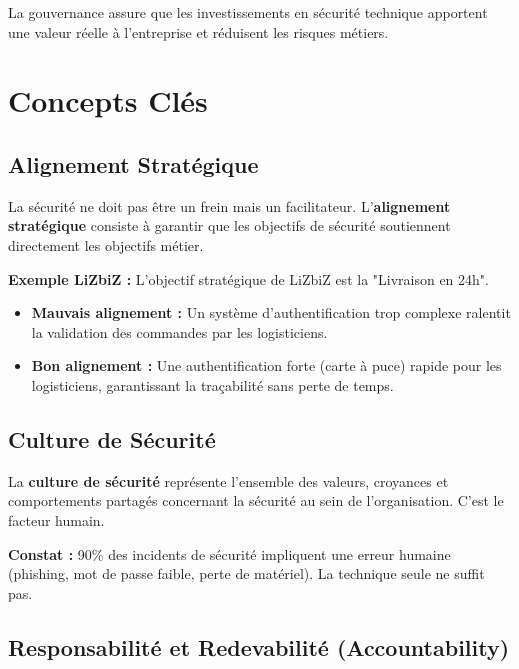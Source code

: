 La gouvernance assure que les investissements en sécurité technique apportent une valeur réelle à l'entreprise et réduisent les risques métiers.

\section{Concepts Clés}

\subsection{Alignement Stratégique}

La sécurité ne doit pas être un frein mais un facilitateur. L'\textbf{alignement stratégique} consiste à garantir que les objectifs de sécurité soutiennent directement les objectifs métier.

\begin{boxlizbiz}
\textbf{Exemple LiZbiZ :} L'objectif stratégique de LiZbiZ est la "Livraison en 24h".
\begin{itemize}
    \item \textbf{Mauvais alignement :} Un système d'authentification trop complexe ralentit la validation des commandes par les logisticiens.
    \item \textbf{Bon alignement :} Une authentification forte (carte à puce) rapide pour les logisticiens, garantissant la traçabilité sans perte de temps.
\end{itemize}
\end{boxlizbiz}

\subsection{Culture de Sécurité}

La \textbf{culture de sécurité} représente l'ensemble des valeurs, croyances et comportements partagés concernant la sécurité au sein de l'organisation. C'est le facteur humain.

\begin{boxdef}
\textbf{Constat :} 90\% des incidents de sécurité impliquent une erreur humaine (phishing, mot de passe faible, perte de matériel). La technique seule ne suffit pas.
\end{boxdef}

\subsection{Responsabilité et Redevabilité (Accountability)}

